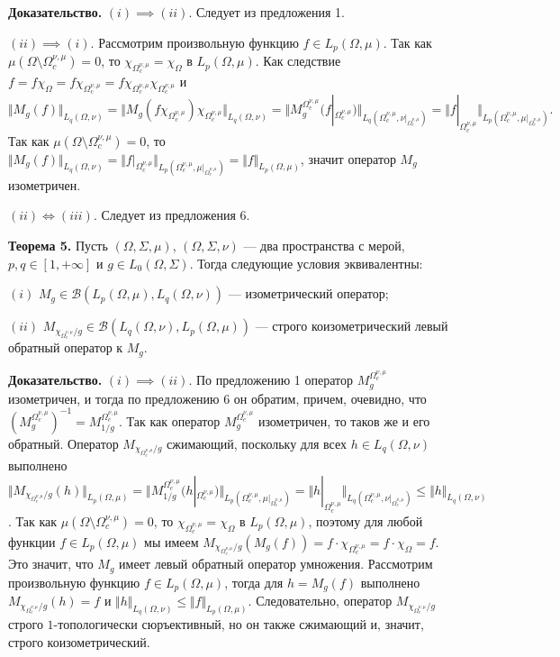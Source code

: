 \documentclass[11pt,twoside]{article}
\begin{document}
\textbf{Доказательство.} $(i)$$\implies$$ (ii)$. Следует из предложения 1. 

$(ii)$$\implies$$ (i)$. Рассмотрим произвольную функцию $f\in L_p(\Omega,\mu)$. Так как $\mu(\Omega\setminus\Omega_c^{\nu,\mu})=0$, то $\chi_{\Omega_c^{\nu,\mu}}=\chi_{\Omega}$ в $L_p(\Omega,\mu)$. Как следствие $f=f\chi_{\Omega}=f\chi_{\Omega_c^{\nu,\mu}}=f\chi_{\Omega_c^{\nu,\mu}}\chi_{\Omega_c^{\nu,\mu}}$ и
$$
\Vert M_g(f)\Vert_{L_q(\Omega,\nu)}
=\Vert M_g(f\chi_{\Omega_c^{\nu,\mu}})\chi_{\Omega_c^{\nu,\mu}}\Vert_{L_q(\Omega,\nu)}
=\Vert M_g^{\Omega_c^{\nu,\mu}}(f|_{\Omega_c^{\nu,\mu}})\Vert_{L_q(\Omega_c^{\nu,\mu},\nu|_{\Omega_c^{\nu,\mu}})}
=\Vert f|_{\Omega_c^{\nu,\mu}}\Vert_{L_p(\Omega_c^{\nu,\mu},\mu|_{\Omega_c^{\nu,\mu}})}.
$$
Так как $\mu(\Omega\setminus\Omega_c^{\nu,\mu})=0$, то $\Vert M_g(f)\Vert_{L_q(\Omega,\nu)}=\Vert f|_{\Omega_c^{\nu,\mu}}\Vert_{L_p(\Omega_c^{\nu,\mu},\mu|_{\Omega_c^{\nu,\mu}})}=\Vert f\Vert_{L_p(\Omega,\mu)}$, значит оператор $M_g$ изометричен.

$(ii)\Longleftrightarrow (iii)$. Следует из предложения 6.

\textbf{Теорема 5.} Пусть $(\Omega,\Sigma,\mu)$, $(\Omega,\Sigma,\nu)$ --- два пространства с мерой, $p,q\in[1,+\infty]$ и $g\in L_0(\Omega,\Sigma)$. Тогда следующие условия эквивалентны:

$(i)$ $M_g\in\mathcal{B}(L_p(\Omega,\mu),L_q(\Omega,\nu))$ --- изометрический оператор;

$(ii)$ $M_{\chi_{\Omega_c^{\nu,\mu}}/g}\in\mathcal{B}(L_q(\Omega,\nu), L_p(\Omega,\mu))$ --- строго коизометрический левый обратный оператор к $M_g$.


\textbf{Доказательство.} $(i)$$\implies$$ (ii)$. По предложению 1 оператор $M_g^{\Omega_c^{\nu,\mu}}$ изометричен, и тогда по предложению 6 он обратим, причем, очевидно, что  $(M_g^{\Omega_c^{\nu,\mu}})^{-1}=M_{1/g}^{\Omega_c^{\nu,\mu}}$. Так как оператор $M_g^{\Omega_c^{\nu,\mu}}$ изометричен, то таков же и его обратный. Оператор $M_{\chi_{\Omega_c^{\nu,\mu}}/g}$ сжимающий, поскольку для всех $h\in L_q(\Omega,\nu)$ выполнено $\Vert M_{\chi_{\Omega_c^{\nu,\mu}}/g}(h)\Vert_{L_p(\Omega,\mu)}=
\Vert M_{1/g}^{\Omega_c^{\nu,\mu}}(h|_{\Omega_c^{\nu,\mu}})\Vert_{L_p(\Omega_c^{\nu,\mu},\mu|_{\Omega_c^{\nu,\mu}})}
=\Vert h|_{\Omega_c^{\nu,\mu}}\Vert_{L_q(\Omega_c^{\nu,\mu},\nu|_{\Omega_c^{\nu,\mu}})}
\leq \Vert h \Vert_{L_q(\Omega,\nu)}$. Так как $\mu(\Omega\setminus\Omega_c^{\nu,\mu})=0$, то $\chi_{\Omega_c^{\nu,\mu}}=\chi_{\Omega}$ в $L_p(\Omega,\mu)$, поэтому для любой функции $f\in L_p(\Omega,\mu)$ мы имеем $M_{\chi_{\Omega_c^{\nu,\mu}}/g}(M_g(f))=f\cdot\chi_{\Omega_c^{\nu,\mu}}=f\cdot\chi_{\Omega}=f$. Это значит, что $M_g$ имеет левый обратный оператор умножения. Рассмотрим произвольную функцию $f\in L_p(\Omega,\mu)$, тогда для $h=M_g(f)$ выполнено $M_{\chi_{\Omega_c^{\nu,\mu}}/g}(h)=f$ и $\Vert h\Vert_{L_q(\Omega,\nu)}\leq\Vert f\Vert_{L_p(\Omega,\mu)}$. Следовательно, оператор $M_{\chi_{\Omega_c^{\nu,\mu}}/g}$ строго $1$-топологически сюръективный, но он также сжимающий и, значит, строго коизометрический.
\end{document}
